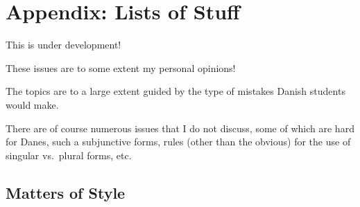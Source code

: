 \documentclass[a4paper,12pt]{report}
\begin{document}
\appendix

\newpage

\chapter*{Appendix: Lists of Stuff}
\label{appendix}

This is under development!

These issues are to some extent my personal opinions!

The topics are to a large extent guided by the type of mistakes Danish
students would make.

There are of course numerous issues that I do not discuss, some of
which are hard for Danes, such a subjunctive forms, rules (other
than the obvious) for the use of singular vs.\ plural forms, etc.

\section*{Matters of Style}
\end{document}
